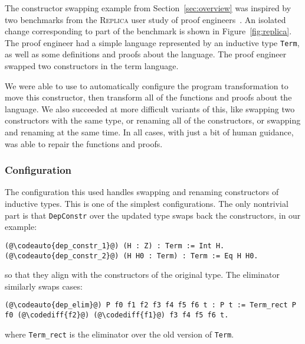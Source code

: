 The constructor swapping example from Section~\ref{sec:overview} was inspired by two benchmarks 
from the \textsc{Replica} user study of proof engineers~\cite{replica}.
An isolated change corresponding to part of the benchmark is shown in Figure~\ref{fig:replica}.
The proof engineer had a simple language represented by an inductive type \lstinline{Term},
as well as some definitions and proofs about the language.
The proof engineer swapped two constructors in the term language.

We were able to use \toolname to automatically configure the program transformation to move this constructor,
then transform all of the functions and proofs about the language.
We also succeeded at more difficult variants of this,
like swapping two constructors with the same type, or renaming all of the constructors,
or swapping and renaming at the same time.
In all cases, with just a bit of human guidance, \toolname was able to repair the functions and proofs.

\subsubsection{Configuration}

The configuration this used handles swapping and renaming constructors of inductive types.
This is one of the simplest configurations.
The only nontrivial part is that \lstinline{DepConstr} over the updated type swaps back the constructors, in our example:

\begin{lstlisting}
(@\codeauto{dep_constr_1}@) (H : Z) : Term := Int H.
(@\codeauto{dep_constr_2}@) (H H0 : Term) : Term := Eq H H0.
\end{lstlisting}
so that they align with the constructors of the original type.
The eliminator similarly swaps cases:

\begin{lstlisting}
(@\codeauto{dep_elim}@) P f0 f1 f2 f3 f4 f5 f6 t : P t := Term_rect P f0 (@\codediff{f2}@) (@\codediff{f1}@) f3 f4 f5 f6 t.
\end{lstlisting}
where \lstinline{Term_rect} is the eliminator over the old version of \lstinline{Term}.


